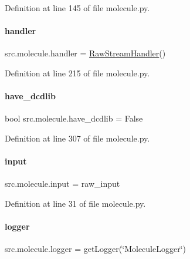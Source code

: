 Definition at line 145 of file molecule.\+py.

\mbox{\label{namespacesrc_1_1molecule_abab499318f0c74dd01f75494c609e720}} 
\paragraph{\texorpdfstring{handler}{handler}}
{\footnotesize\ttfamily src.\+molecule.\+handler = \hyperlink{classsrc_1_1molecule_1_1RawStreamHandler}{Raw\+Stream\+Handler}()}



Definition at line 215 of file molecule.\+py.

\mbox{\label{namespacesrc_1_1molecule_aab4fe1dc561e993a549fa87600b86c66}} 
\paragraph{\texorpdfstring{have\+\_\+dcdlib}{have\_dcdlib}}
{\footnotesize\ttfamily bool src.\+molecule.\+have\+\_\+dcdlib = False}



Definition at line 307 of file molecule.\+py.

\mbox{\label{namespacesrc_1_1molecule_a24a2611c587c2e6cf9597e87bdeba703}} 
\paragraph{\texorpdfstring{input}{input}}
{\footnotesize\ttfamily src.\+molecule.\+input = raw\+\_\+input}



Definition at line 31 of file molecule.\+py.

\mbox{\label{namespacesrc_1_1molecule_a3d3f329e9dbef8c64d056e17c705fe32}} 
\paragraph{\texorpdfstring{logger}{logger}}
{\footnotesize\ttfamily src.\+molecule.\+logger = get\+Logger(\char`\"{}Molecule\+Logger\char`\"{})}



